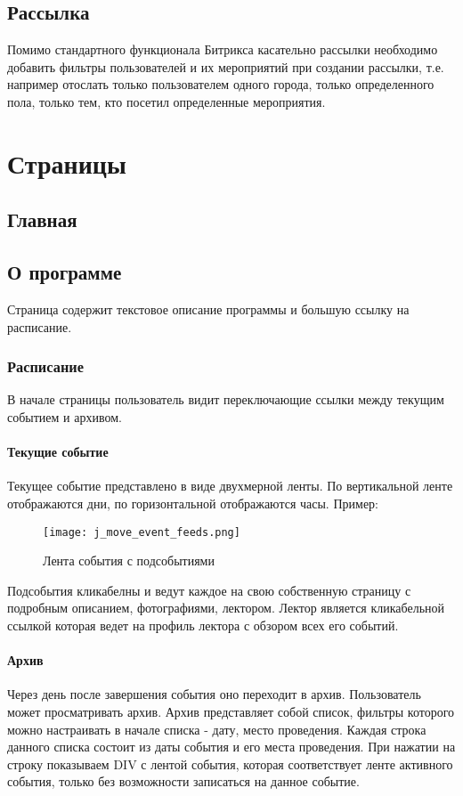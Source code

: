 \documentclass[DIV=calc, paper=a4, fontsize=11pt]{scrartcl} %
\begin{document}
\subsection{Рассылка}
Помимо стандартного функционала Битрикса касательно рассылки необходимо добавить фильтры пользователей и их мероприятий при создании рассылки, т.е. например отослать только пользователем одного города, только определенного пола, только тем, кто посетил определенные мероприятия.

\section{Страницы}

\subsection{Главная}

\subsection{О программе}
Страница содержит текстовое описание программы и большую ссылку на расписание.
\subsubsection{Расписание}
В начале страницы пользователь видит переключающие ссылки между текущим событием и архивом.

\paragraph{Текущие событие}
Текущее событие представлено в виде двухмерной ленты. По вертикальной ленте отображаются дни, по горизонтальной отображаются часы. Пример:
        \begin{figure}[H]
        \centering
        \texttt{[image: j\_move\_event\_feeds.png]}
        \caption{Лента события с подсобытиями\label{fig:j_move_event_feeds.png}}
        \end{figure}

Подсобытия кликабелны и ведут каждое на свою собственную страницу с подробным описанием, фотографиями, лектором. Лектор является кликабельной ссылкой которая ведет на профиль лектора с обзором всех его событий.
        
\paragraph{Архив \label{archive}} 
Через день после завершения события оно переходит в архив. Пользователь может просматривать архив. Архив представляет собой список, фильтры которого можно настраивать в начале списка - дату, место проведения. Каждая строка данного списка состоит из даты события и его места проведения. При нажатии на строку показываем DIV с лентой события, которая соответствует ленте активного события, только без возможности записаться на данное событие.
\end{document}
